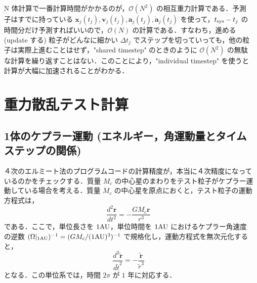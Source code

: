 \documentclass[11pt,a4paper,oneside,onecolumn]{jreport}
\begin{document}
N 体計算で一番計算時間がかかるのが，$\mathcal{O} (N^2)$ の相互重力計算である．予測子はすでに持っている ${\bm x}_j (t_j), {\bm v}_j (t_j), {\bm a}_j (t_j), \dot{{\bm a}}_j (t_j)$ を使って，$t_{{\rm sys}} - t_j$ の時間分だけ予測すればいいので，$\mathcal{O} (N)$ の計算である．すなわち，進める (update する) 粒子がどんなに細かい $\Delta t_j$ でステップを切っていっても，他の粒子は実際上進むことはせず，"shared timestep" のときのように $\mathcal{O} (N^2)$ の無駄な計算を繰り返すことはない．このことにより，"individual timestep" を使うと計算が大幅に加速されることがわかる．

\section{重力散乱テスト計算}
\subsection{1体のケプラー運動 (エネルギー，角運動量とタイムステップの関係)}
４次のエルミート法のプログラムコードの計算精度が，本当に４次精度になっているのかをチェックする．質量 $M_c$ の中心星のまわりをテスト粒子がケプラー運動している場合を考える．質量 $M_c$ の中心星を原点におくと，テスト粒子の運動方程式は，
\begin{equation}
\frac{d^2 {\bm r}}{d t^2} = - \frac{G M_c {\bm r}}{r^3}
\end{equation}
である．ここで，単位長さを $1 {\rm AU}$，単位時間を $1 {\rm AU}$ におけるケプラー角速度の逆数 $(\Omega |_{1 {\rm AU}})^{-1} = (G  M_c / (1 {\rm AU})^3)^{-1}$ で規格化し，運動方程式を無次元化すると，
\begin{equation}
\frac{d^2 \tilde{\bm r}}{d  \tilde{t}^2} = - \frac{\tilde{\bm r}}{\tilde{r}^3}
\end{equation}
となる．この単位系では，時間 $2 \pi$ が $1$ 年に対応する．
\end{document}
